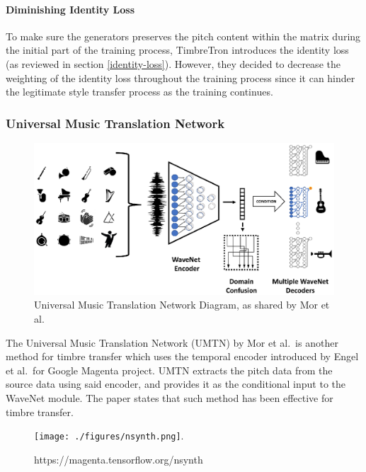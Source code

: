 \documentclass[]{article}
\begin{document}
\paragraph{Diminishing Identity Loss}

To make sure the generators preserves the pitch content within the
matrix during the initial part of the training process, TimbreTron
introduces the identity loss (as reviewed in section
\ref{identity-loss}). However, they decided to decrease the weighting of
the identity loss throughout the training process since it can hinder
the legitimate style transfer process as the training continues.

\hypertarget{universal-music-translation-network}{%
\subsubsection{Universal Music Translation
Network}\label{universal-music-translation-network}}

\begin{figure}[h]
    \includegraphics[width=\textwidth]{figures/facebook_umtn.eps}
    \centering
    \caption{Universal Music Translation Network Diagram, as shared by Mor et al. \label{fig:facebook_umtn}}
\end{figure}

The Universal Music Translation Network (UMTN) by Mor et al.~is another
method for timbre transfer which uses the temporal encoder introduced by
Engel et al.~for Google Magenta project. UMTN extracts the pitch data
from the source data using said encoder, and provides it as the
conditional input to the WaveNet module. The paper states that such
method has been effective for timbre transfer.

\begin{figure}[h]
    \texttt{[image: ./figures/nsynth.png]}.
    \centering
    \caption{https://magenta.tensorflow.org/nsynth \label{fig:nsynth}}
\end{figure}
\end{document}
